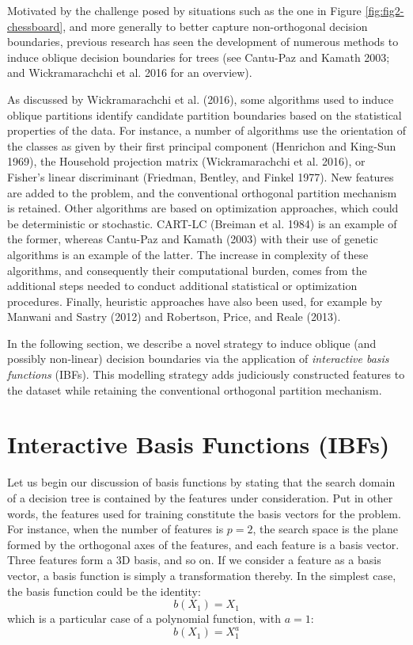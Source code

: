 \documentclass[]{elsarticle} %
\begin{document}
Motivated by the challenge posed by situations such as the one in Figure
\ref{fig:fig2-chessboard}, and more generally to better capture
non-orthogonal decision boundaries, previous research has seen the
development of numerous methods to induce oblique decision boundaries
for trees (see Cantu-Paz and Kamath 2003; and Wickramarachchi et al.
2016 for an overview).

As discussed by Wickramarachchi et al. (2016), some algorithms used to
induce oblique partitions identify candidate partition boundaries based
on the statistical properties of the data. For instance, a number of
algorithms use the orientation of the classes as given by their first
principal component (Henrichon and King-Sun 1969), the Household
projection matrix (Wickramarachchi et al. 2016), or Fisher's linear
discriminant (Friedman, Bentley, and Finkel 1977). New features are
added to the problem, and the conventional orthogonal partition
mechanism is retained. Other algorithms are based on optimization
approaches, which could be deterministic or stochastic. CART-LC (Breiman
et al. 1984) is an example of the former, whereas Cantu-Paz and Kamath
(2003) with their use of genetic algorithms is an example of the latter.
The increase in complexity of these algorithms, and consequently their
computational burden, comes from the additional steps needed to conduct
additional statistical or optimization procedures. Finally, heuristic
approaches have also been used, for example by Manwani and Sastry (2012)
and Robertson, Price, and Reale (2013).

In the following section, we describe a novel strategy to induce oblique
(and possibly non-linear) decision boundaries via the application of
\emph{interactive basis functions} (IBFs). This modelling strategy adds
judiciously constructed features to the dataset while retaining the
conventional orthogonal partition mechanism.

\section{Interactive Basis Functions
(IBFs)}\label{interactive-basis-functions-ibfs}

Let us begin our discussion of basis functions by stating that the
search domain of a decision tree is contained by the features under
consideration. Put in other words, the features used for training
constitute the basis vectors for the problem. For instance, when the
number of features is \(p=2\), the search space is the plane formed by
the orthogonal axes of the features, and each feature is a basis vector.
Three features form a 3D basis, and so on. If we consider a feature as a
basis vector, a basis function is simply a transformation thereby. In
the simplest case, the basis function could be the identity: \[
b(X_1) = X_1
\] which is a particular case of a polynomial function, with \(a=1\): \[
b(X_1) = X_1^a
\]
\end{document}
